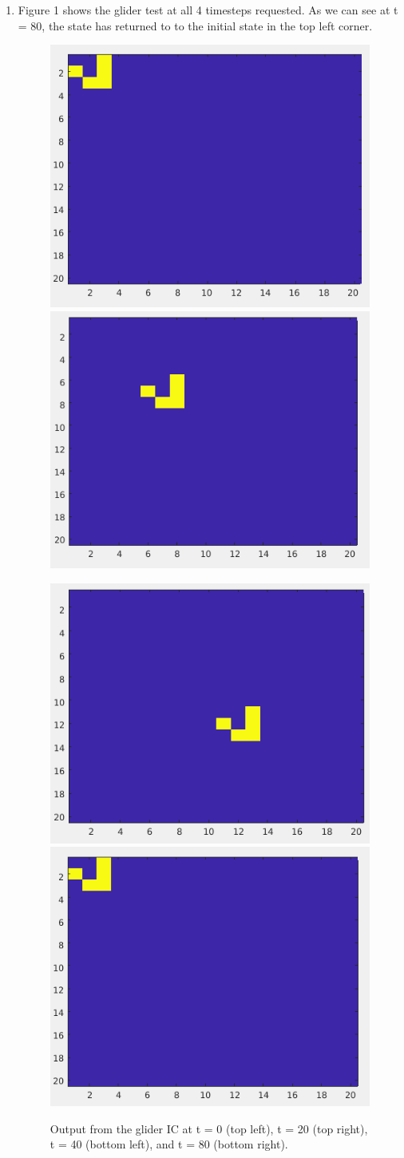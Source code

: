 \documentclass{article}
\begin{document}
\begin{enumerate}[label=\alph*)]
\item Figure 1 shows the glider test at all 4 timesteps requested. As we can see
at t = 80, the state has returned to to the initial state in the top left
corner. 
\begin{figure}
    \centering
        \includegraphics[width=.48\textwidth]{glidertest0.png}
        \includegraphics[width=.48\textwidth]{glidertest20.png}
    \emp

        \includegraphics[width=.48\textwidth]{glidertest40.png}
        \includegraphics[width=.48\textwidth]{glidertest80.png}
    \emp
    \caption{Output from the glider IC at t = 0 (top left), t = 20 (top right),
    t = 40 (bottom left), and t = 80 (bottom right).}
\end{figure}
\end{enumerate}
\end{document}
